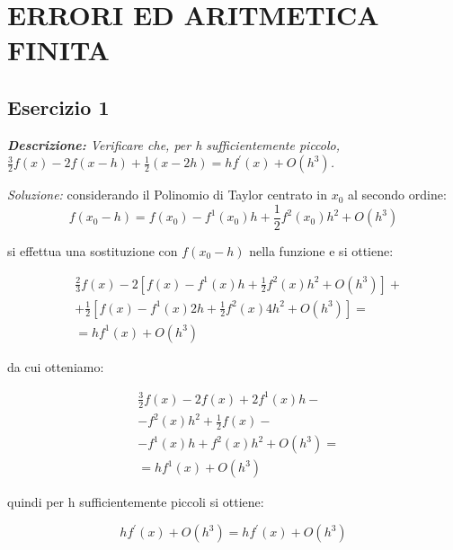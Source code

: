 \chapter{ERRORI ED ARITMETICA FINITA}
\section{Esercizio 1}
\textit{\textbf{Descrizione:} Verificare che, per h sufficientemente piccolo, $\frac{3}{2}f(x)-2f(x-h)+\frac{1}{2}(x-2h)= hf^{'}(x)+ O(h^{3})$.}\newline

\noindent\emph{Soluzione: }\newline
considerando il Polinomio di Taylor centrato in  $x_{0}$ al secondo ordine:
\begin{equation}
	 f(x_{0} - h) = f(x_{0}) - f^{1}(x_{0})h + \frac{1}{2}f^{2}(x_{0})h^{2}+O(h^{3})
\end{equation}

si effettua una sostituzione con $f(x_{0} - h)$  nella funzione e si ottiene:

\begin{equation}
  \begin{aligned}
      & \frac{2}{3}f(x) - 2\left [ f(x)-f^{1}(x)h+\frac{1}{2}f^{2}(x)h^{2}+O(h^{3}) \right ] + \\
      & +   \frac{1}{2} \left [f(x)-f^{1}(x)2h+\frac{1}{2}f^{2}(x)4h^{2}+O(h^{3})  \right ] = \\
      & = hf^{1}(x)+O(h^{3})
  \end{aligned}
\end{equation}

da cui otteniamo:

\begin{equation}
  \begin{aligned}
      & \frac{3}{2}f(x)-2f(x)+2f^{1}(x)h - \\
      &  - f^{2}(x)h^{2}+\frac{1}{2}f(x) - \\
      &  - f^{1}(x)h+f^{2}(x)h^{2}+O(h^{3}) = \\
      &  = hf^{1}(x)+O(h^{3})
  \end{aligned}
\end{equation}

quindi per h sufficientemente piccoli si ottiene:\newline

\begin{equation}
	 hf^{'}(x)+ O(h^{3}) = hf^{'}(x)+ O(h^{3})
\end{equation}
\newline